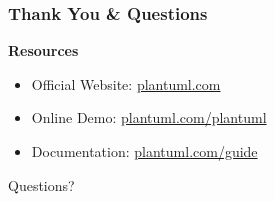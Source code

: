 \documentclass{beamer}
\begin{document}
\begin{frame}
    \frametitle{Thank You \& Questions}
    
    \begin{center}
    \Large
    \textbf{Resources}
    \end{center}
    
    \vspace{0.5cm}
    \begin{itemize}
        \item Official Website: \href{http://plantuml.com}{plantuml.com}
        \item Online Demo: \href{http://plantuml.com/plantuml}{plantuml.com/plantuml}
        \item Documentation: \href{http://plantuml.com/guide}{plantuml.com/guide}
    \end{itemize}
    
    \vspace{1cm}
    \begin{center}
    \large
    Questions?
    \end{center}
\end{frame}
\end{document}
